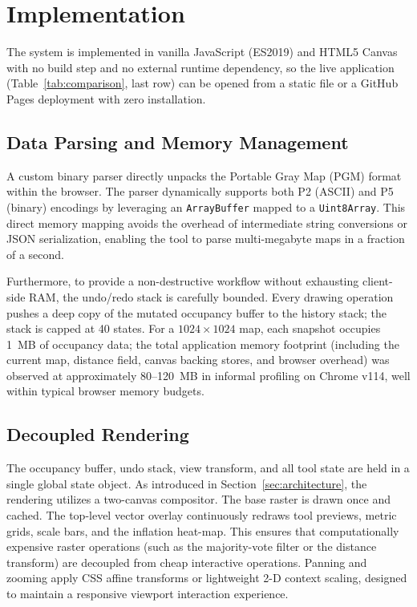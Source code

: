 \documentclass[journal]{IEEEtran}
\begin{document}
\section{Implementation}
\label{sec:implementation}
The system is implemented in vanilla JavaScript (ES2019) and HTML5 Canvas with no build step and no external runtime dependency, so the live application (Table~\ref{tab:comparison}, last row) can be opened from a static file or a GitHub Pages deployment with zero installation. 

\subsection{Data Parsing and Memory Management}
A custom binary parser directly unpacks the Portable Gray Map (PGM) format within the browser. The parser dynamically supports both P2 (ASCII) and P5 (binary) encodings by leveraging an \texttt{ArrayBuffer} mapped to a \texttt{Uint8Array}. This direct memory mapping avoids the overhead of intermediate string conversions or JSON serialization, enabling the tool to parse multi-megabyte maps in a fraction of a second.

Furthermore, to provide a non-destructive workflow without exhausting client-side RAM, the undo/redo stack is carefully bounded. Every drawing operation pushes a deep copy of the mutated occupancy buffer to the history stack; the stack is capped at 40 states. For a $1024 \times 1024$ map, each snapshot occupies 1~MB of occupancy data; the total application memory footprint (including the current map, distance field, canvas backing stores, and browser overhead) was observed at approximately 80--120~MB in informal profiling on Chrome v114, well within typical browser memory budgets.

\subsection{Decoupled Rendering}
The occupancy buffer, undo stack, view transform, and all tool state are held in a single global state object. As introduced in Section~\ref{sec:architecture}, the rendering utilizes a two-canvas compositor. The base raster is drawn once and cached. The top-level vector overlay continuously redraws tool previews, metric grids, scale bars, and the inflation heat-map. This ensures that computationally expensive raster operations (such as the majority-vote filter or the distance transform) are decoupled from cheap interactive operations. Panning and zooming apply CSS affine transforms or lightweight 2-D context scaling, designed to maintain a responsive viewport interaction experience.
\end{document}
